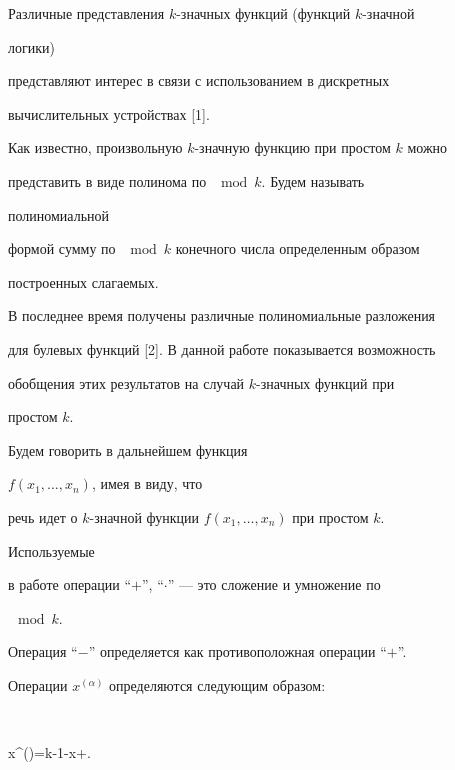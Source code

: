 




\maketitle





Различные представления $k$-значных функций (функций $k$-значной


логики)


представляют интерес в связи с использованием в дискретных


вычислительных устройствах [1].





Как известно, произвольную $k$-значную функцию при простом $k$ можно


представить в виде полинома по $\mod{k}$. Будем называть


полиномиальной


формой сумму по $\mod{k}$ конечного числа определенным образом


построенных слагаемых.





В последнее время получены различные полиномиальные разложения


для булевых функций [2]. В данной работе показывается возможность


обобщения этих результатов на случай $k$-значных функций при


простом $k$.





Будем говорить в дальнейшем функция


$f(x_1,\dotsc,x_n)$, имея в виду, что


речь идет о $k$-значной функции $f(x_1,\dotsc,x_n)$ при простом $k$.


Используемые


в работе операции ``$+$'', ``$\cdot$'' --- это сложение и умножение по


$\mod{k}$.


Операция ``$-$'' определяется как противоположная операции ``$+$''.


Операции $x^{(\alpha)}$ определяются следующим образом:


$$


x^{(\alpha)}=k-1-x+\alpha.



